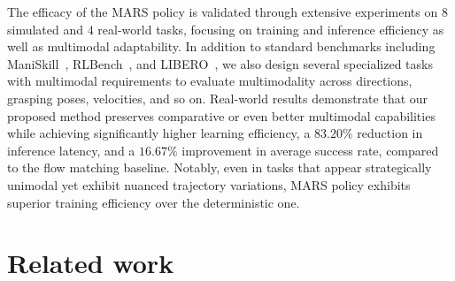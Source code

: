 The efficacy of the MARS policy is validated through extensive experiments on $8$ simulated and $4$ real-world tasks, focusing on training and inference efficiency as well as multimodal adaptability. In addition to standard benchmarks including {ManiSkill}~\citep{mu2021maniskill}, {RLBench}~\citep{james2020rlbench}, and {LIBERO}~\citep{liu2023libero}, we also design several specialized tasks with multimodal requirements to evaluate multimodality across directions, grasping poses, velocities, and so on.  Real-world results demonstrate that our proposed method preserves comparative or even better multimodal capabilities while achieving significantly higher learning efficiency, a $83.20\%$ reduction in inference latency, and a $16.67\%$ improvement in average success rate, compared to the flow matching baseline. Notably, even in tasks that appear strategically unimodal yet exhibit nuanced trajectory variations, MARS policy exhibits superior training efficiency over the deterministic one. 



\section{Related work}

